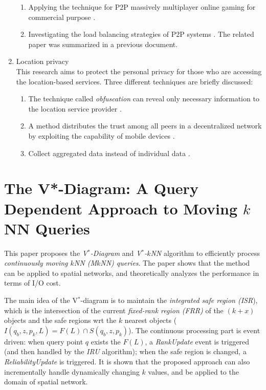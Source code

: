 \documentclass[paper=a4, fontsize=18pt]{article} %
\numberwithin{equation}{section} %
\numberwithin{figure}{section} %
\numberwithin{table}{section} %
\begin{document}
\begin{enumerate}
{\begin{enumerate}
    \item Applying the technique for P2P massively multiplayer online gaming for commercial purpose \cite{THSNN06}.
    \item Investigating the load balancing strategies of P2P systems \cite{ATZK08}. The related paper was summarized in a previous document.
    \end{enumerate}
}
\item {Location privacy\\
This research aims to protect the personal privacy for those who are accessing the location-based services. Three different techniques are briefly discussed:
    \begin{enumerate}
    \item The technique called \emph{obfuscation} can reveal only necessary information to the location service provider \cite{DK05}.
    \item A method distributes the trust among all peers in a decentralized network by exploiting the capability of mobile devices \cite{HK07}.
    \item Collect aggregated data instead of individual data \cite{XTK07}.
    \end{enumerate}
}
\end{enumerate}

\section{The V*-Diagram: A Query Dependent Approach to Moving $k$NN Queries \cite{NZTK08}}

This paper proposes the \emph{V$^*$-Diagram} and \emph{V$^*$-$k$NN} algorithm to efficiently process \emph{continuously moving $k$NN (M$k$NN) queries}. The paper shows that the method can be applied to spatial networks, and theoretically analyzes the performance in terms of I/O cost.

The main idea of the V$^*$-diagram is to maintain the \emph{integrated safe region (ISR}), which is the intersection of the current \emph{fixed-rank region (FRR)} of the $(k+x)$ objects and the safe regions wrt the $k$ nearest objects ($I(q_b, z, p_k, L) = F(L) \cap S(q_b,z,p_k)$). The continuous processing part is event driven: when query point $q$ exists the $F(L)$, a \emph{RankUpdate} event is triggered (and then handled by the \emph{IRU} algorithm); when the safe region is changed, a \emph{ReliabilityUpdate} is triggered. It is shown that the proposed approach can also incrementally handle dynamically changing $k$ values, and be applied to the domain of spatial network.
\end{document}

